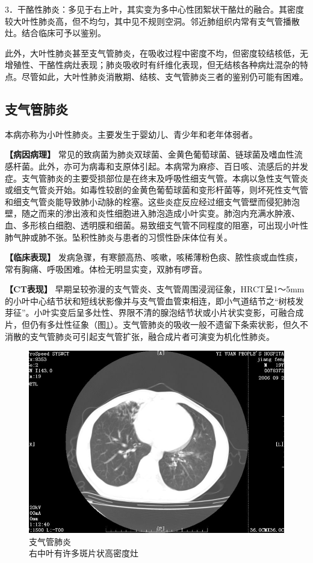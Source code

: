 3．干酪性肺炎：多见于右上叶，其实变为多中心性团絮状干酪灶的融合。其密度较大叶性肺炎高，但不均匀，其中见不规则空洞。邻近肺组织内常有支气管播散灶。结合临床可予以鉴别。

此外，大叶性肺炎甚至支气管肺炎，在吸收过程中密度不均，但密度较结核低，无增殖性、干酪性病灶表现；肺炎吸收时有纤维化表现，但无结核各种病灶混杂的特点。尽管如此，大叶性肺炎消散期、结核、支气管肺炎三者的鉴别仍可能有困难。

\subsection{支气管肺炎}

本病亦称为小叶性肺炎。主要发生于婴幼儿、青少年和老年体弱者。

\textbf{【病因病理】}
常见的致病菌为肺炎双球菌、金黄色葡萄球菌、链球菌及嗜血性流感杆菌。此外，亦可为病毒和支原体引起。本病常为麻疹、百日咳、流感后的并发症。支气管肺炎的主要受损部位是在终末及呼吸性细支气管。本病以急性支气管炎或细支气管炎开始。如毒性较剧的金黄色葡萄球菌和变形杆菌等，则坏死性支气管和细支气管炎能导致肺小动脉的栓塞。这些炎症反应经过细支气管壁而侵犯肺泡壁，随之而来的渗出液和炎性细胞进入肺泡造成小叶实变。肺泡内充满水肿液、血、多形核白细胞、透明膜和细菌。易致细支气管不同程度的阻塞，可出现小叶性肺气肿或肺不张。坠积性肺炎与患者的习惯性卧床体位有关。

\textbf{【临床表现】}
发病急骤，有寒颤高热、咳嗽，咳稀薄粉色痰、脓性痰或血性痰，常有胸痛、呼吸困难。体检无明显实变，双肺有啰音。

\textbf{【CT表现】}
早期呈较弥漫的支气管炎、支气管周围浸润征象，HRCT呈1～5mm的小叶中心结节状和短线状影像并与支气管血管束相连，即小气道结节之“树枝发芽征”。小叶实变后呈多灶性、界限不清的腺泡结节状或小片状实变影，可融合成片，但仍有多灶性征象（图\ref{fig9-17}）。支气管肺炎的吸收一般不遗留下条索状影，但久不消散的支气管肺炎可引起支气管扩张，融合成片者可演变为机化性肺炎。

\begin{figure}[!htbp]
 \centering
 \includegraphics[width=.7\textwidth,height=\textheight,keepaspectratio]{./images/Image00202.jpg}
 \captionsetup{justification=centering}
 \caption{支气管肺炎\\{\small 右中叶有许多斑片状高密度灶}}
 \label{fig9-17}
  \end{figure} 

